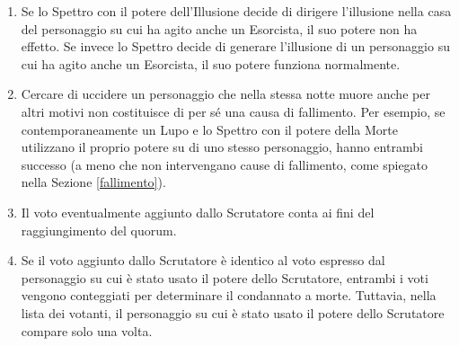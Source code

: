 \documentclass[a4paper,10pt]{article}
\begin{document}
\begin{enumerate}
 
 
 \item  Se lo Spettro con il potere dell'Illusione decide di dirigere l'illusione nella casa del personaggio su cui ha agito anche un Esorcista, il suo potere non ha effetto.
 Se invece lo Spettro decide di generare l'illusione di un personaggio su cui ha agito anche un Esorcista, il suo potere funziona normalmente.
 
 \item Cercare di uccidere un personaggio che nella stessa notte muore anche per altri motivi non costituisce di per sé una causa di fallimento.
 Per esempio, se contemporaneamente un Lupo e lo Spettro con il potere della Morte utilizzano il proprio potere su di uno stesso personaggio, hanno entrambi successo (a meno che non intervengano cause di fallimento, come spiegato nella Sezione \ref{fallimento}).
 
 \item Il voto eventualmente aggiunto dallo Scrutatore conta ai fini del raggiungimento del quorum.
 
 \item Se il voto aggiunto dallo Scrutatore è identico al voto espresso dal personaggio su cui è stato usato il potere dello Scrutatore, entrambi i voti vengono conteggiati per determinare il condannato a morte.
 Tuttavia, nella lista dei votanti, il personaggio su cui è stato usato il potere dello Scrutatore compare solo una volta.
 

\end{enumerate}
\end{document}
